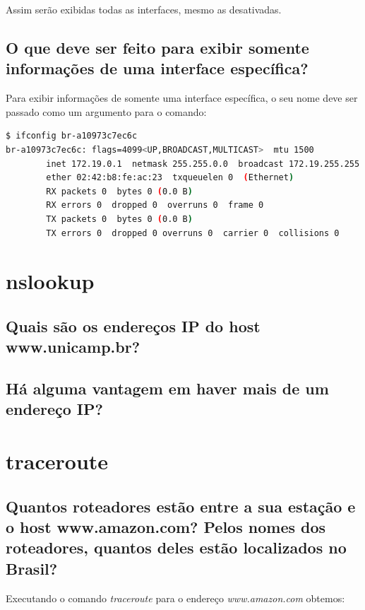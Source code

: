 \documentclass[12pt,a4paper]{report}
\begin{document}
\noindent Assim serão exibidas todas as interfaces, mesmo as desativadas.

\subsection{O que deve ser feito para exibir somente informações de uma interface específica?}

Para exibir informações de somente uma interface específica, o seu nome deve ser passado como um argumento para o comando:

\begin{lstlisting}[language=bash]
$ ifconfig br-a10973c7ec6c
br-a10973c7ec6c: flags=4099<UP,BROADCAST,MULTICAST>  mtu 1500
        inet 172.19.0.1  netmask 255.255.0.0  broadcast 172.19.255.255
        ether 02:42:b8:fe:ac:23  txqueuelen 0  (Ethernet)
        RX packets 0  bytes 0 (0.0 B)
        RX errors 0  dropped 0  overruns 0  frame 0
        TX packets 0  bytes 0 (0.0 B)
        TX errors 0  dropped 0 overruns 0  carrier 0  collisions 0
\end{lstlisting}

\section{nslookup}
\subsection{Quais são os endereços IP do host www.unicamp.br?}
\subsection{Há alguma vantagem em haver mais de um endereço IP?}

\section{traceroute}
\subsection{Quantos roteadores estão entre a sua estação e o host www.amazon.com? Pelos nomes dos roteadores, quantos deles estão localizados no Brasil?}

Executando o comando \emph{traceroute} para o endereço \emph{www.amazon.com} obtemos: 
\end{document}

